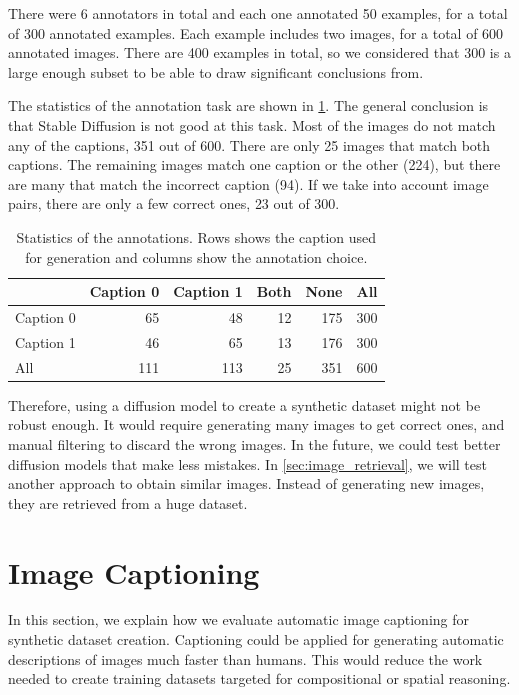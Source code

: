 There were 6 annotators in total and each one annotated 50 examples, for a total of 300 annotated examples. Each example includes two images, for a total of 600 annotated images. There are 400 examples in total, so we considered that 300 is a large enough subset to be able to draw significant conclusions from.

The statistics of the annotation task are shown in \cref{tab:annotation}. The general conclusion is that Stable Diffusion is not good at this task. Most of the images do not match any of the captions, 351 out of 600. There are only 25 images that match both captions. The remaining images match one caption or the other (224), but there are many that match the incorrect caption (94). If we take into account image pairs, there are only a few correct ones, 23 out of 300.

\begin{table}[ht]
    \centering
    \begin{tabular}{l|rrrr|r}
    \toprule
    {} & Caption 0  &  Caption 1 &  Both &  None & All \\
    \midrule
    Caption 0    &   65 &  48 &  12 & 175 & 300\\
    Caption 1    &   46 &  65 &  13 & 176 & 300\\
    \midrule
    All  &   111 &    113 &    25 &    351 & 600\\
    \bottomrule
    \end{tabular}
    \caption{Statistics of the annotations. Rows shows the caption used for generation and columns show the annotation choice.}
    \label{tab:annotation}
\end{table}

Therefore, using a diffusion model to create a synthetic dataset might not be robust enough. It would require generating many images to get correct ones, and manual filtering to discard the wrong images. In the future, we could test better diffusion models that make less mistakes. In \cref{sec:image_retrieval}, we will test another approach to obtain similar images. Instead of generating new images, they are retrieved from a huge dataset.

\section{Image Captioning} \label{sec:image_captioning}

In this section, we explain how we evaluate automatic image captioning for synthetic dataset creation. Captioning could be applied for generating automatic descriptions of images much faster than humans. This would reduce the work needed to create training datasets targeted for compositional or spatial reasoning.


